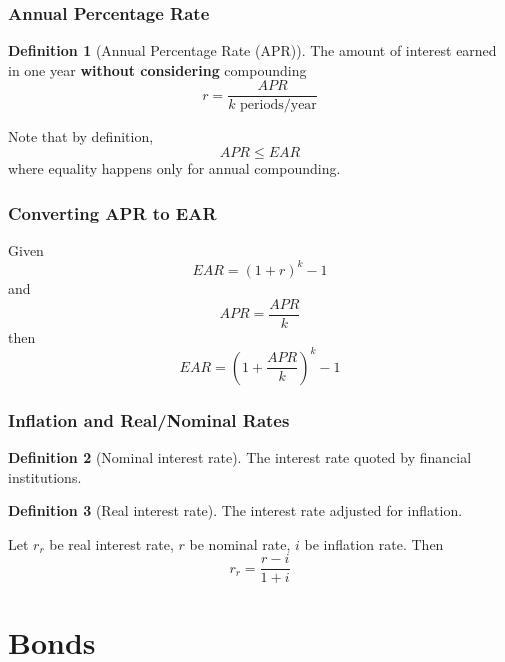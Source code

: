 \documentclass[11pt]{article}
\theoremstyle{definition}
\newtheorem*{definition}{Definition}
\begin{document}
\subsubsection{Annual Percentage Rate}
\begin{definition}[Annual Percentage Rate (APR)]
    The amount of interest earned in one year \textbf{without considering} compounding
    \begin{equation*}
        r = \frac{APR}{k \text{ periods/year}}
    \end{equation*}
\end{definition}
Note that by definition,
\begin{equation*}
    APR \leq EAR
\end{equation*}
where equality happens only for annual compounding.

\subsubsection{Converting APR to EAR}
Given 
\begin{equation*}
    EAR = (1 + r)^k - 1
\end{equation*}
and 
\begin{equation*}
    APR = \frac{APR}{k}
\end{equation*}
then 
\begin{equation*}
    EAR = \left(1 + \frac{APR}{k}\right)^k - 1
\end{equation*}

\subsubsection{Inflation and Real/Nominal Rates}
\begin{definition}[Nominal interest rate]
    The interest rate quoted by financial institutions.
\end{definition}
\begin{definition}[Real interest rate]
    The interest rate adjusted for inflation.
\end{definition}
Let $r_r$ be real interest rate, $r$ be nominal rate, $i$ be inflation rate. Then
\begin{equation*}
    r_r = \frac{r-i}{1 + i}
\end{equation*}

\section{Bonds}
\end{document}
